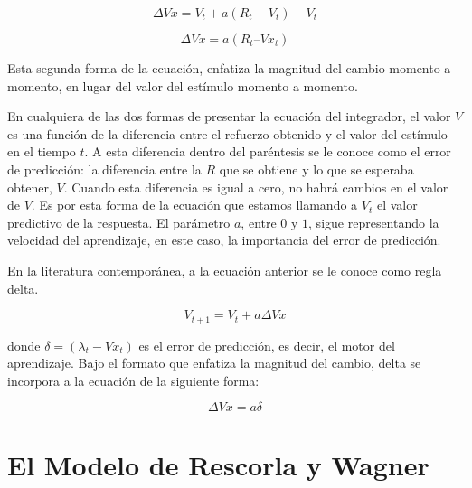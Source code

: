 \documentclass[
  letterpaper,
]{book}
\begin{document}
\[
\Delta Vx = V_t + a (R_t -V_t) - V_t
\]

\[
\Delta Vx = a(R_t – Vx_t)
\]

Esta segunda forma de la ecuación, enfatiza la magnitud del cambio
momento a momento, en lugar del valor del estímulo momento a momento.

En cualquiera de las dos formas de presentar la ecuación del integrador,
el valor \(V\) es una función de la diferencia entre el refuerzo
obtenido y el valor del estímulo en el tiempo \(t\). A esta diferencia
dentro del paréntesis se le conoce como el error de predicción: la
diferencia entre la \(R\) que se obtiene y lo que se esperaba obtener,
\(V\). Cuando esta diferencia es igual a cero, no habrá cambios en el
valor de \(V\). Es por esta forma de la ecuación que estamos llamando a
\(V_t\) el valor predictivo de la respuesta. El parámetro \(a\), entre
\(0\) y \(1\), sigue representando la velocidad del aprendizaje, en este
caso, la importancia del error de predicción.

En la literatura contemporánea, a la ecuación anterior se le conoce como
regla delta.

\[
V_{t+1} = V_t + a \Delta Vx
\]

donde \(\delta = (\lambda_t - Vx_t)\) es el error de predicción, es
decir, el motor del aprendizaje. Bajo el formato que enfatiza la
magnitud del cambio, delta se incorpora a la ecuación de la siguiente
forma:

\[
\Delta Vx = a \delta
\]


\chapter{El Modelo de Rescorla y
Wagner}\label{el-modelo-de-rescorla-y-wagner}
\end{document}
